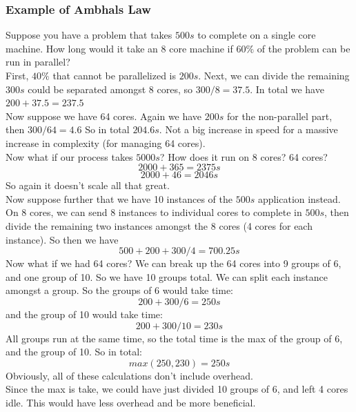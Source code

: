 \documentclass[12pt]{article}
\theoremstyle{definition}
\begin{document}
\subsubsection{Example of Ambhals Law}
Suppose you have a problem that takes $500s$ to complete on a single core machine. How long would it take an 8 core machine if $60\%$ of the problem can be run in parallel?
\\ \linebreak
First, $40\%$ that cannot be parallelized is $200s$. Next, we can divide the remaining $300s$ could be separated amongst 8 cores, so $300/8 = 37.5$. In total we have $200 + 37.5 = 237.5$
\\ \linebreak
Now suppose we have 64 cores. Again we have $200s$ for the non-parallel part, then $300/64 = 4.6$ So in total $204.6s$. Not a big increase in speed for a massive increase in complexity (for managing 64 cores). 
\\ \linebreak
Now what if our process takes $5000s$? How does it run on 8 cores? 64 cores?
$$2000 + 365 = 2375s$$
$$2000 + 46 = 2046s$$
So again it doesn't scale all that great.
\\ \linebreak
Now suppose further that we have 10 instances of the $500s$ application instead. On 8 cores, we can send 8 instances to individual cores to complete in $500s$, then divide the remaining two instances amongst the 8 cores (4 cores for each instance). So then we have 
$$500 + 200 + 300/4 = 700.25s$$
Now what if we had 64 cores?
We can break up the 64 cores into 9 groups of 6, and one group of 10. So we have 10 groups total. We can split each instance amongst a group. So the groups of 6 would take time:
$$200 + 300/6 = 250s$$
and the group of 10 would take time:
$$ 200 + 300/10 = 230s$$
All groups run at the same time, so the total time is the max of the group of 6, and the group of 10. So in total:
$$ max(250, 230) = 250s$$
Obviously, all of these calculations don't include overhead.
\\ \linebreak
Since the max is take, we could have just divided 10 groups of 6, and left 4 cores idle. This would have less overhead and be more beneficial.
\end{document}
